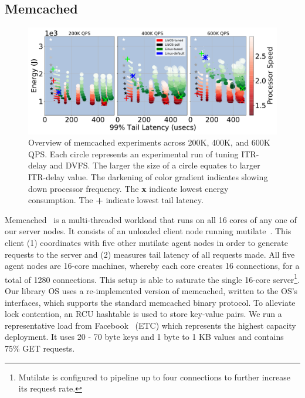\subsection{Memcached}
\label{sec:mcd}

\begin{figure}
\centering
\includegraphics[width=1\textwidth]{figures/mcd_overview}
\caption[]
{Overview of memcached experiments across 200K, 400K, and 600K QPS. Each circle represents an experimental run of tuning ITR-delay and DVFS. The larger the size of a circle equates to larger ITR-delay value. The darkening of color gradient indicates slowing down processor frequency. The \textbf{x} indicate lowest energy consumption. The \textbf{+} indicate lowest tail latency.}
\label{fig:mcd_overview}
\end{figure}

Memcached~\cite{mcd} is a multi-threaded workload that runs on all 16 cores of any one of our server nodes. It consists of an unloaded client node running mutilate~\cite{mutilate}. This client (1) coordinates with five other mutilate agent nodes in order to generate requests to the server and (2) measures tail latency of all requests made. All five agent nodes are 16-core machines, whereby each core creates 16 connections, for a total of 1280 connections. This setup is able to saturate the single 16-core server\footnote{Mutilate is configured to pipeline up to four connections to further increase its request rate.}. Our library OS uses a re-implemented version of memcached, written to the OS's interfaces, which supports the standard memcached binary protocol. To alleviate lock contention, an RCU hashtable is used to store key-value pairs. We run a representative load from Facebook~\cite{workloadanalysisfacebook} (ETC) which represents the highest capacity deployment. It uses 20 - 70 byte keys and 1 byte to 1 KB values and contains 75\% GET requests.

